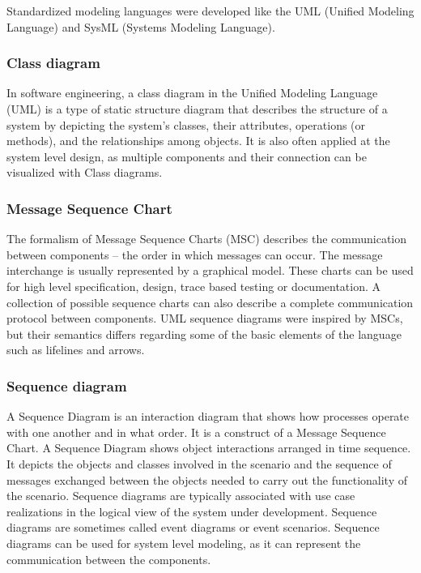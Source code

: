 Standardized modeling languages were developed like the UML (Unified Modeling Language\citep{uml}) and SysML (Systems Modeling Language\citep{sysml1}\citep{sysml2}).

\subsubsection{Class diagram}

In software engineering, a class diagram in the Unified Modeling Language (UML) is a type of static structure diagram that describes the structure of a system by depicting the system's classes, their attributes, operations (or methods), and the relationships among objects. It is also often applied at the system level design, as multiple components and their connection can be visualized with Class diagrams.

\subsubsection{Message Sequence Chart}

The formalism of Message Sequence Charts (MSC) describes the communication between components -- the order in which messages can occur\citep{msc}\citep{msc2}\citep{Klose2003}. The message interchange is usually represented by a graphical model. These charts can be used for high level specification, design, trace based testing or documentation. A collection of possible sequence charts can also describe a complete communication protocol between components. UML sequence diagrams were inspired by MSCs, but their semantics differs regarding some of the basic elements of the language such as lifelines and arrows\citep{mscuml}.

\subsubsection{Sequence diagram}

A Sequence Diagram is an interaction diagram that shows how processes operate with one another and in what order. It is a construct of a Message Sequence Chart. A Sequence Diagram shows object interactions arranged in time sequence. It depicts the objects and classes involved in the scenario and the sequence of messages exchanged between the objects needed to carry out the functionality of the scenario. Sequence diagrams are typically associated with use case realizations in the logical view of the system under development. Sequence diagrams are sometimes called event diagrams or event scenarios. Sequence diagrams can be used for system level modeling, as it can represent the communication between the components. 


